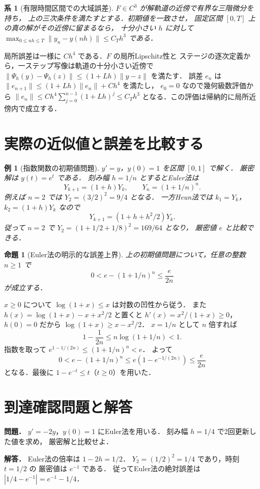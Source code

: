 \documentclass[a5paper,10pt,onecolumn]{jsarticle}
\makeatletter
\theoremstyle{mathnotetheorem}
\newtheorem{proposition}[theorem]{命題}
\newtheorem{corollary}[theorem]{系}
\newtheorem{example}[theorem]{例}
\renewcommand{\proofname}{証明}
\renewenvironment{proof}[1][\proofname]{%
  \par\pushQED{\qed}\normalfont\topsep4\p@\@plus2\p@\relax
  \trivlist\item[\hskip\labelsep\bfseries #1]\ignorespaces
}{\popQED\endtrivlist\@endpefalse}
\newcommand{\norm}[1]{\lVert #1\rVert}
\makeatother
\begin{document}
\begin{corollary}[有限時間区間での大域誤差]
$F\in C^3$ が解軌道の近傍で有界な三階微分を持ち，
上の三次条件を満たすとする．初期値を一致させ，
固定区間 $[0,T]$ 上の真の解がその近傍に留まるなら，
十分小さい $h$ に対して
$\max_{0\le nh\le T}\norm{y_n-y(nh)}\le C_T h^3$ である．
\end{corollary}
\begin{proof}
局所誤差は一様に $Ch^4$ である．$F$ の局所Lipschitz性と
ステージの逐次定義から，一ステップ写像は軌道の十分小さい近傍で
$\norm{\Psi_h(y)-\Psi_h(z)}\le(1+Lh)\norm{y-z}$ を満たす．
誤差 $e_n$ は
$\norm{e_{n+1}}\le(1+Lh)\norm{e_n}+Ch^4$ を満たし，
$e_0=0$ なので幾何級数評価から
$\norm{e_n}\le Ch^4\sum_{j=0}^{n-1}(1+Lh)^j
 \le C_T h^3$ となる．この評価は帰納的に局所近傍内で成立する．
\end{proof}


\section{実際の近似値と誤差を比較する}
\begin{example}[指数関数の初期値問題]
$y'=y$，$y(0)=1$ を区間 $[0,1]$ で解く．
厳密解は $y(t)=e^t$ である．
刻み幅 $h=1/n$ とするとEuler法は
\[
 Y_{k+1}=(1+h)Y_k,\qquad
 Y_n=(1+1/n)^n.
\]
例えば $n=2$ では $Y_2=(3/2)^2=9/4$ となる．
一方Heun法では $k_1=Y_k$，
$k_2=(1+h)Y_k$ なので
\[
 Y_{k+1}=(1+h+h^2/2)Y_k.
\]
従って $n=2$ で
$Y_2=(1+1/2+1/8)^2=169/64$ となり，
厳密値 $e$ と比較できる．
\end{example}
\begin{proposition}[Euler法の明示的な誤差上界]
上の初期値問題について，任意の整数 $n\ge1$ で
\[
 0<e-(1+1/n)^n\le \frac{e}{2n}
\]
が成立する．
\end{proposition}
\begin{proof}
$x\ge0$ について
$\log(1+x)\le x$ は対数の凹性から従う．
また $h(x)=\log(1+x)-x+x^2/2$ と置くと
$h'(x)=x^2/(1+x)\ge0$，$h(0)=0$
だから $\log(1+x)\ge x-x^2/2$．
$x=1/n$ として $n$ 倍すれば
\[
 1-\frac1{2n}\le n\log(1+1/n)<1.
\]
指数を取って
$e^{1-1/(2n)}\le(1+1/n)^n<e$．
よって
\[
 0<e-(1+1/n)^n
 \le e(1-e^{-1/(2n)})
 \le\frac{e}{2n}
\]
となる．最後に $1-e^{-t}\le t$（$t\ge0$）を用いた．
\end{proof}
\section*{到達確認問題と解答}
\noindent\textbf{問題．}
$y'=-2y$，$y(0)=1$ にEuler法を用いる．
刻み幅 $h=1/4$ で2回更新した値を求め，
厳密解と比較せよ．

\medskip\noindent\textbf{解答．}
Euler法の倍率は $1-2h=1/2$．
$Y_2=(1/2)^2=1/4$ であり，時刻 $t=1/2$ の
厳密値は $e^{-1}$ である．
従ってEuler法の絶対誤差は
$|1/4-e^{-1}|=e^{-1}-1/4$．
\end{document}
